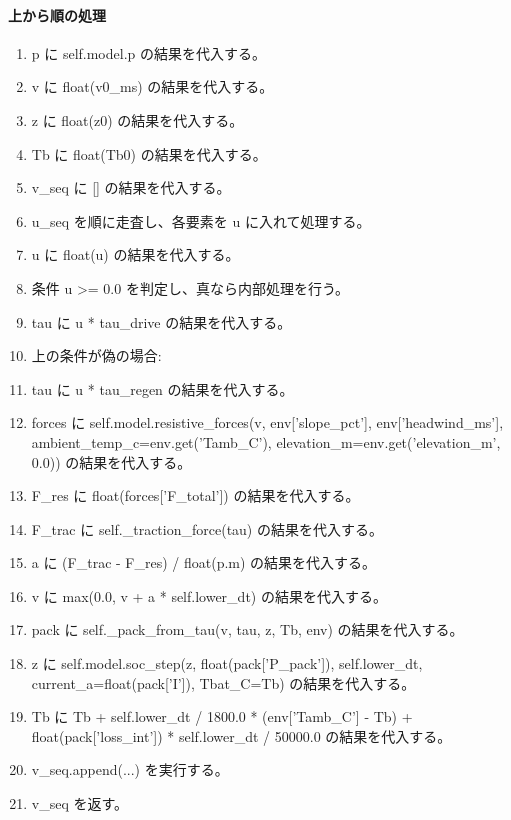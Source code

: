 \documentclass[a4paper,11pt]{article}
\begin{document}
            \paragraph{上から順の処理}
            \begin{enumerate}[leftmargin=1.8em]
            \item p に self.model.p の結果を代入する。
\item v に float(v0\_ms) の結果を代入する。
\item z に float(z0) の結果を代入する。
\item Tb に float(Tb0) の結果を代入する。
\item v\_seq に [] の結果を代入する。
\item u\_seq を順に走査し、各要素を u に入れて処理する。
\item   u に float(u) の結果を代入する。
\item   条件 u >= 0.0 を判定し、真なら内部処理を行う。
\item     tau に u * tau\_drive の結果を代入する。
\item     上の条件が偽の場合:
\item     tau に u * tau\_regen の結果を代入する。
\item   forces に self.model.resistive\_forces(v, env['slope\_pct'], env['headwind\_ms'], ambient\_temp\_c=env.get('Tamb\_C'), elevation\_m=env.get('elevation\_m', 0.0)) の結果を代入する。
\item   F\_res に float(forces['F\_total']) の結果を代入する。
\item   F\_trac に self.\_traction\_force(tau) の結果を代入する。
\item   a に (F\_trac - F\_res) / float(p.m) の結果を代入する。
\item   v に max(0.0, v + a * self.lower\_dt) の結果を代入する。
\item   pack に self.\_pack\_from\_tau(v, tau, z, Tb, env) の結果を代入する。
\item   z に self.model.soc\_step(z, float(pack['P\_pack']), self.lower\_dt, current\_a=float(pack['I']), Tbat\_C=Tb) の結果を代入する。
\item   Tb に Tb + self.lower\_dt / 1800.0 * (env['Tamb\_C'] - Tb) + float(pack['loss\_int']) * self.lower\_dt / 50000.0 の結果を代入する。
\item   v\_seq.append(...) を実行する。
\item v\_seq を返す。
            \end{enumerate}
\end{document}
